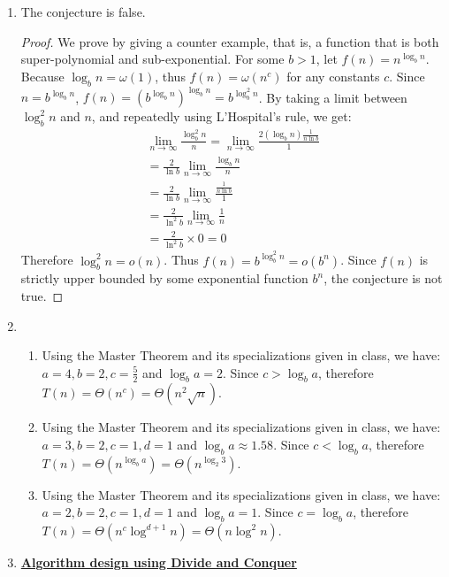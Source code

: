 \documentclass[11pt]{article}
\begin{document}
\begin{enumerate}
\item %
The conjecture is false.
\begin{proof}
  We prove by giving a counter example, that is, a function that is
  both super-polynomial and sub-exponential. For some $b>1$, let $f(n) = n^{\log_b
    n}$. Because $\log_b n = \omega(1)$, thus $f(n) = \omega(n^c)$ for any
  constants $c$. Since $n = b^{\log_b n}$, $f(n) = (b^{\log_b n})^{\log_b n} =
  b^{\log_b^2 n}$. By taking a limit between $\log_b^2 n$ and $n$, and repeatedly
  using L'Hospital’s rule, we get:
  \begin{align}
    \lim_{n\to\infty} \frac{\log_b^2 n}{n} = \lim_{n\to\infty}
    \frac{2(\log_b n)\frac{1}{n\ln b}}{1} \\= \frac{2}{\ln b}
    \lim_{n\to\infty} \frac{\log_b n}{n} \\ = \frac{2}{\ln
      b}\lim_{n\to\infty} \frac{\frac{1}{n\ln b}}{1} \\= \frac{2}{\ln^2
      b}\lim_{n\to\infty} \frac{1}{n} \\= \frac{2}{\ln^2 b} \times 0 = 0
  \end{align}
  Therefore $\log_b^2 n = o(n)$. Thus $f(n) = b^{\log_b^2 n} =
  o(b^n)$. Since $f(n)$ is strictly upper bounded by some exponential
  function $b^n$, the conjecture is not true. 
\end{proof}

\item %
\begin{enumerate}
\item Using the Master Theorem and its specializations given in class,
  we have: $a = 4, b = 2, c = \frac{5}{2}$ and $\log_b a = 2$. Since
  $c > \log_b a$, therefore $T(n) = \Theta(n^c) = \Theta(n^2\sqrt{n})$.

\item Using the Master Theorem and its specializations given in class,
  we have: $a = 3, b = 2, c = 1, d = 1$ and $\log_b a \approx 1.58$. Since
  $c < \log_b a$, therefore $T(n) = \Theta(n^{\log_b a}) =
  \Theta(n^{\log_2 3})$.

\item Using the Master Theorem and its specializations given in class,
  we have: $a = 2, b = 2, c = 1, d = 1$ and $\log_b a = 1$. Since
  $c = \log_b a$, therefore $T(n) = \Theta(n^c\log^{d+1} n) = \Theta(n\log^2 n)$.
\end{enumerate}

\item %
\underline{\textbf{Algorithm design using Divide and Conquer}}


\end{enumerate}
\end{document}
